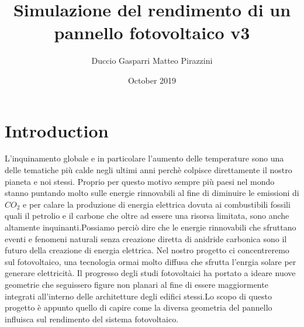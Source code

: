 \documentclass{article}
\title{Simulazione del rendimento di un pannello fotovoltaico v3}
\author{Duccio Gasparri Matteo Pirazzini}
\date{October 2019}
\begin{document}
\maketitle

\section{Introduction}
  L'inquinamento globale e in particolare l'aumento delle temperature sono una delle tematiche più calde negli ultimi anni perchè colpisce direttamente il nostro pianeta e noi stessi. Proprio per questo motivo sempre più paesi nel mondo stanno puntando molto sulle energie rinnovabili al fine di diminuire le emissioni di $CO_{2}$ e per calare la produzione di energia elettrica dovuta ai combustibili fossili quali il petrolio e il carbone che oltre ad essere una risorsa limitata, sono anche altamente inquinanti.Possiamo perciò dire che le energie rinnovabili che sfruttano eventi e fenomeni naturali senza creazione diretta di anidride carbonica sono il futuro della creazione di energia elettrica. Nel nostro progetto ci concentreremo sul fotovoltaico, una tecnologia ormai molto diffusa che sfrutta l'enrgia solare per generare elettricità.
  Il progresso degli studi fotovoltaici ha portato a ideare nuove geometrie che seguissero figure non planari al fine di essere maggiormente integrati all'interno delle architetture degli  edifici stessi.Lo scopo di questo progetto è appunto quello di capire come la diversa geometria del pannello influisca sul rendimento del sistema fotovoltaico.
\end{document}
